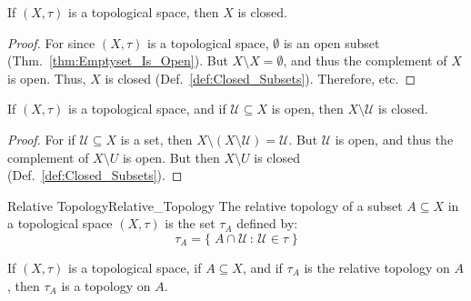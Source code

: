     \begin{theorem}
        \label{thm:Whole_Space_Is_Closed}%
        If $(X,\tau)$ is a topological space, then $X$ is closed.
    \end{theorem}
    \begin{proof}
        For since $(X,\tau)$ is a topological space, $\emptyset$ is an open
        subset (Thm.~\ref{thm:Emptyset_Is_Open}). But $X\setminus{X}=\emptyset$,
        and thus the complement of $X$ is open. Thus, $X$ is closed
        (Def.~\ref{def:Closed_Subsets}). Therefore, etc.
    \end{proof}
    \begin{theorem}
        \label{thm:Comp_of_Open_is_Closed}%
        If $(X,\tau)$ is a topological space, and if $\mathcal{U}\subseteq{X}$
        is open, then $X\setminus\mathcal{U}$ is closed.
    \end{theorem}
    \begin{proof}
        For if $\mathcal{U}\subseteq{X}$ is a set, then
        $X\setminus(X\setminus\mathcal{U})=\mathcal{U}$. But $\mathcal{U}$ is
        open, and thus the complement of $X\setminus{U}$ is open. But then
        $X\setminus{U}$ is closed (Def.~\ref{def:Closed_Subsets}).
    \end{proof}
    \begin{ldefinition}{Relative Topology}{Relative_Topology}
        The relative topology of a subset $A\subseteq{X}$ in a topological space
        $(X,\tau)$ is the set $\tau_{A}$ defined by:
        \begin{equation}
            \tau_{A}=\big\{\;A\cap\mathcal{U}\,:\,\mathcal{U}\in\tau\;\big\}
        \end{equation}
    \end{ldefinition}
    \begin{theorem}
        If $(X,\tau)$ is a topological space, if $A\subseteq{X}$, and if
        $\tau_{A}$ is the relative topology on $A$, then $\tau_{A}$ is a
        topology on $A$.
    \end{theorem}
